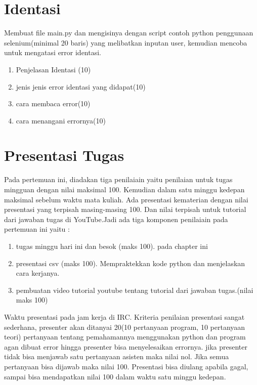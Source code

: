 \section{Identasi}
Membuat file main.py dan mengisinya dengan script contoh python penggunaan selenium(minimal 20 baris) yang melibatkan inputan user, kemudian mencoba untuk mengatasi error identasi.
\begin{enumerate}
	\item
Penjelasan Identasi (10)
	\item
jenis jenis error identasi yang didapat(10)
\item
cara membaca error(10)
\item 
cara menangani errornya(10)
\end{enumerate}

\section{Presentasi Tugas}
Pada pertemuan ini, diadakan tiga penilaiain yaitu penilaian untuk tugas mingguan dengan nilai maksimal 100. Kemudian dalam satu minggu kedepan maksimal sebelum waktu mata kuliah. Ada presentasi kematerian dengan nilai presentasi yang terpisah masing-masing 100. Dan nilai terpisah untuk tutorial dari jawaban tugas di YouTube.Jadi ada tiga komponen penilaiain pada pertemuan ini yaitu :
\begin{enumerate}
	\item tugas minggu hari ini dan besok (maks 100). pada chapter ini
	\item presentasi csv (maks 100). Mempraktekkan kode python dan menjelaskan cara kerjanya.
	\item pembuatan video tutorial youtube tentang tutorial dari jawaban tugas.(nilai maks 100)
\end{enumerate}
Waktu presentasi pada jam kerja di IRC. Kriteria penilaian presentasi sangat sederhana, presenter akan ditanyai 20(10 pertanyaan program, 10 pertanyaan teori) pertanyaan tentang pemahamannya menggunakan python dan program agan dibuat error hingga presenter bisa menyelesaikan errornya. jika presenter tidak bisa menjawab satu pertanyaan asisten maka nilai nol. Jika semua pertanyaan bisa dijawab maka nilai 100. Presentasi bisa diulang apabila gagal, sampai bisa mendapatkan nilai 100 dalam waktu satu minggu kedepan.

